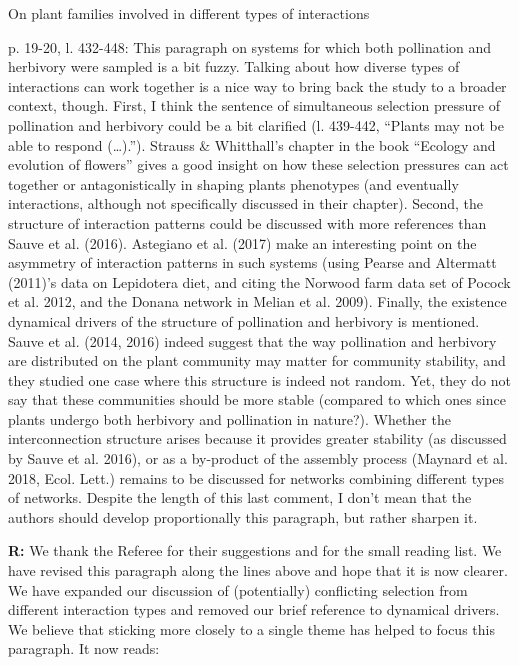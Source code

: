 \documentclass[12pt]{letter}
\newenvironment{refquote}{\bigskip \begin{it}}{\end{it}\smallskip}
\begin{document}
		\begin{refquote}
			On plant families involved in different types of interactions

			p. 19-20, l. 432-448: This paragraph on systems for which both pollination and herbivory were sampled is a bit fuzzy. Talking about how diverse types of interactions can work together is a nice way to bring back the study to a broader context, though.
			First, I think the sentence of simultaneous selection pressure of pollination and herbivory could be a bit clarified (l. 439-442, “Plants may not be able to respond (…).”). Strauss \& Whitthall’s chapter in the book “Ecology and evolution of flowers” gives a good insight on how these selection pressures can act together or antagonistically in shaping plants phenotypes (and eventually interactions, although not specifically discussed in their chapter).
			Second, the structure of interaction patterns could be discussed with more references than Sauve et al. (2016). Astegiano et al. (2017) make an interesting point on the asymmetry of interaction patterns in such systems (using Pearse and Altermatt (2011)’s data on Lepidotera diet, and citing the Norwood farm data set of Pocock et al. 2012, and the Donana network in Melian et al. 2009).
			Finally, the existence dynamical drivers of the structure of pollination and herbivory is mentioned. Sauve et al. (2014, 2016) indeed suggest that the way pollination and herbivory are distributed on the plant community may matter for community stability, and they studied one case where this structure is indeed not random. Yet, they do not say that these communities should be more stable (compared to which ones since plants undergo both herbivory and pollination in nature?). Whether the interconnection structure arises because it provides greater stability (as discussed by Sauve et al. 2016), or as a by-product of the assembly process (Maynard et al. 2018, Ecol. Lett.) remains to be discussed for networks combining different types of networks.
			Despite the length of this last comment, I don’t mean that the authors should develop proportionally this paragraph, but rather sharpen it.
		\end{refquote}


		\textbf{R:} We thank the Referee for their suggestions and for the small reading list. We have revised this paragraph along the lines above and hope that it is now clearer. We have expanded our discussion of (potentially) conflicting selection from different interaction types and removed our brief reference to dynamical drivers. We believe that sticking more closely to a single theme has helped to focus this paragraph. It now reads:
\end{document}
